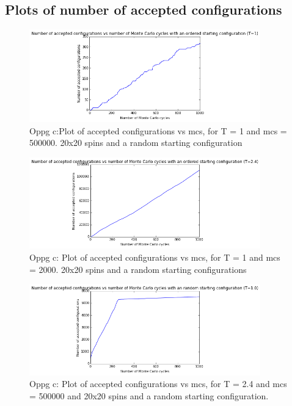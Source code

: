\documentclass[twocolumn]{article}
\begin{document}
\centering\subsection{Plots of number of accepted configurations}

\begin{figure}[h!]
  \centering
  \caption{Oppg c:Plot of accepted configurations vs mcs, for T = 1 and mcs = 500000. 20x20 spins and a random starting configuration}
  \includegraphics[width=10cm]{configs_plot_1.png}
\end{figure}

\begin{figure}[h!]
  \centering
  \caption{Oppg c: Plot of accepted configurations vs mcs, for T = 1 and mcs = 2000. 20x20 spins and a random starting configurations}
  \includegraphics[width=10cm]{configs_plot_2.png}
\end{figure}

\begin{figure}[h!]
  \centering
  \caption{Oppg c: Plot of accepted configurations vs mcs, for T = 2.4 and mcs = 500000 and 20x20 spins and a random starting configuration.}
  \includegraphics[width=10cm]{configs_plot_3.png}
\end{figure}
\end{document}
